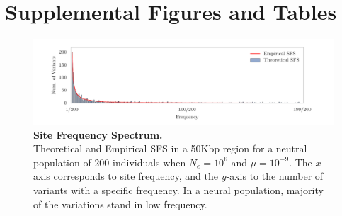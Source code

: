 \section{Supplemental Figures and Tables}

\begin{figure}[H]
	\centering
	\includegraphics[trim=.01in 0.1in .01in 
	0.1in,clip,width=\textwidth]{figures/sfs.pdf}
	\caption{{\bf Site Frequency Spectrum.}\\ Theoretical and
          Empirical SFS in a 50Kbp region for a neutral population of 200
          individuals when $N_e=10^6$ and $\mu=10^{-9}$. The $x$-axis 
          corresponds to site frequency, and
          the $y$-axis to the number of variants with a specific
          frequency. 
          In a neural population, majority of the variations stand in low 
          frequency.} \label{fig:sfs}
\end{figure}



